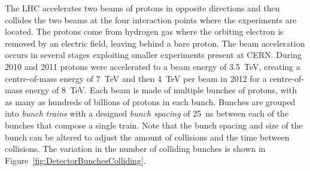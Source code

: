 The LHC accelerates two beams of protons in opposite directions and then collides the two beams at the four interaction points where the experiments are located. The protons come from hydrogen gas where the orbiting electron is removed by an electric field, leaving behind a bare proton. The beam acceleration occurs in several stages exploiting smaller experiments present at CERN. During 2010 and 2011 protons were accelerated to a beam energy of \SI{3.5}{\TeV}, creating a centre-of-mass energy of \SI{7}{\TeV} and then \SI{4}{\TeV} per beam in 2012 for a centre-of-mass energy of \SI{8}{\TeV}. Each beam is made of multiple bunches of protons, with as many as hundreds of billions of protons in each bunch. Bunches are grouped into \textit{bunch trains} with a designed \textit{bunch spacing} of \SI{25}{\ns} between each of the bunches that compose a single train. Note that the bunch spacing and size of the bunch can be altered to adjust the amount of collisions and the time between collisions. The variation in the number of colliding bunches is shown in Figure~\ref{fig:DetectorBunchesColliding}.

